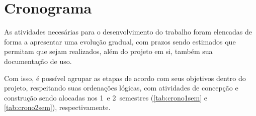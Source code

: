 \bigskip

\chapter{Cronograma} \label{cha:cronograma}

As atividades necesárias para o desenvolvimento do trabalho foram elencadas
de forma a apresentar uma evolução gradual, com prazos sendo estimados que
permitam que sejam realizados, além do projeto em si, também sua documentação
de uso.

Com isso, é possível agrupar as etapas de acordo com seus objetivos dentro do
projeto, respeitando suas ordenações lógicas, com atividades de concepção e
construção sendo alocadas nos 1\textordmasculine\ e 2\textordmasculine\ 
semestres (\autoref{tab:crono1sem} e \autoref{tab:crono2sem}), respectivamente.


